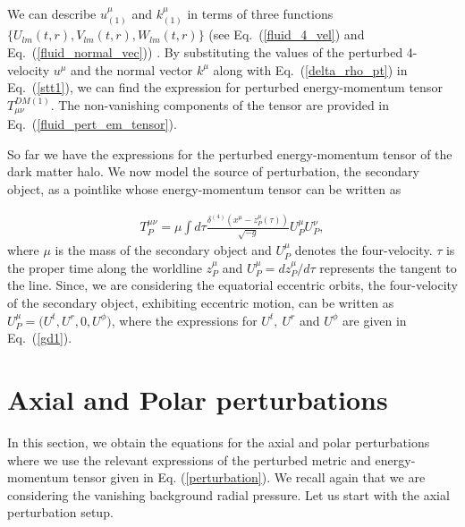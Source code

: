 \documentclass[11pt]{article}
\begin{document}
We can describe $u^{\mu}_{(1)}$ and $k^{\mu}_{(1)}$ in terms of three functions $\{U_{l m}(t,r), V_{l m}(t,r), W_{l m}(t,r)\}$ (see  Eq.~(\ref{fluid_4_vel}) and Eq.~(\ref{fluid_normal_vec})) \cite{PhysRevD.67.104017}.
By substituting the values of the perturbed 4-velocity $u^{\mu}$ and the normal vector $k^{\mu}$ along with Eq.~(\ref{delta_rho_pt}) in Eq.~(\ref{stt1}), we can find the expression for perturbed energy-momentum tensor $T_{\mu\nu}^{DM (1)}$. The non-vanishing components of the tensor are provided in  Eq.~(\ref{fluid_pert_em_tensor}).\par
So far we have the expressions for the perturbed energy-momentum tensor of the dark matter halo. We now model the source of perturbation, the secondary object, as a pointlike whose energy-momentum tensor can be written as \cite{Poisson:2011nh}

\begin{align}\label{src}
    T^{\mu\nu}_{P} = \mu \int d\tau \frac{\delta^{(4)}(x^{\mu}-z^{\mu}_{P}(\tau))}{\sqrt{-g}}U^{\mu}_{P}U^{\nu}_{P},
\end{align}
where $\mu$ is the mass of the secondary object and $U^{\mu}_{P}$ denotes the four-velocity. $\tau$ is the proper time along the worldline $z^{\mu}_{P}$ and $U^{\mu}_{P} = dz^{\mu}_{P}/d\tau$ represents the tangent to the line. Since, we are considering the equatorial eccentric orbits, the four-velocity of the secondary object, exhibiting eccentric motion, can be written as $U^{\mu}_{P} = \Big(U^{t}, U^{r}, 0, U^{\phi}\Big)$, where the expressions for $U^{t},~ U^{r}$ and $U^{\phi}$ are given in Eq.~(\ref{gd1}).  


\section{Axial and Polar perturbations}\label{axpt}
In this section, we obtain the equations for the axial and polar perturbations where we use the relevant expressions of the perturbed metric and energy-momentum tensor given in Eq. (\ref{perturbation}). We recall again that we are considering the vanishing background radial pressure. Let us start with the axial perturbation setup.
\end{document}
